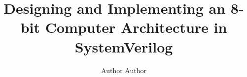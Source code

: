 \documentclass[parskip=full]{scrreprt}
\title{Designing and Implementing an 8-bit Computer Architecture in SystemVerilog}
\author{Author Author}
\date{}
\begin{document}
\maketitle

\tableofcontents






\
\listoffigures
\listoftables
\lstlistoflistings
\printbibliography
\end{document}
